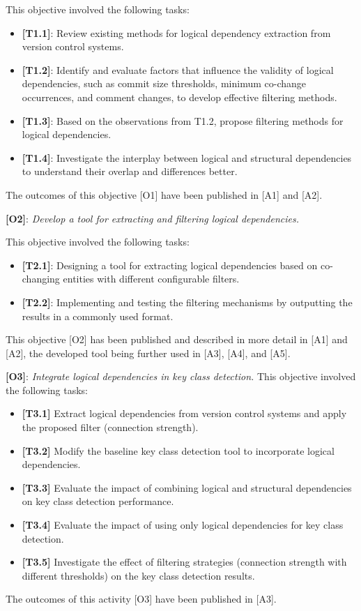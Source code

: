 This objective involved the following tasks:
\begin{itemize}
\item \textbf{[T1.1]}: Review existing methods for logical dependency extraction from version control systems.
\item \textbf{[T1.2]}: Identify and evaluate factors that influence the validity of logical dependencies, such as commit size thresholds, minimum co-change occurrences, and comment changes, to develop effective filtering methods.
\item \textbf{[T1.3]}: Based on the observations from T1.2, propose filtering methods for logical dependencies.
\item \textbf{[T1.4]}: Investigate the interplay between logical and structural dependencies to understand their overlap and differences better.
\end{itemize}
The outcomes of this objective [O1] have been published in [A1] and [A2].


\textbf{[O2]}: \textit{Develop a tool for extracting and filtering logical dependencies.}

This objective involved the following tasks:
\begin{itemize}
\item \textbf{[T2.1]}: Designing a tool for extracting logical dependencies based on co-changing entities with different configurable filters.
\item \textbf{[T2.2]}: Implementing and testing the filtering mechanisms by outputting the results in a commonly used format.
\end{itemize}
This objective [O2] has been published and described in more detail in [A1] and [A2], the developed tool being further used in [A3], [A4], and [A5].



\textbf{[O3]}: \textit{Integrate logical dependencies in key class detection.}
This objective involved the following tasks:
\begin{itemize}
\item \textbf{[T3.1]} Extract logical dependencies from version control systems and apply the proposed filter (connection strength).
\item \textbf{[T3.2]} Modify the baseline key class detection tool to incorporate logical dependencies.
\item \textbf{[T3.3]} Evaluate the impact of combining logical and structural dependencies on key class detection performance.
\item \textbf{[T3.4]} Evaluate the impact of using only logical dependencies for key class detection.
\item \textbf{[T3.5]} Investigate the effect of filtering strategies (connection strength with different thresholds) on the key class detection results.
\end{itemize}
The outcomes of this activity [O3] have been published in [A3].

